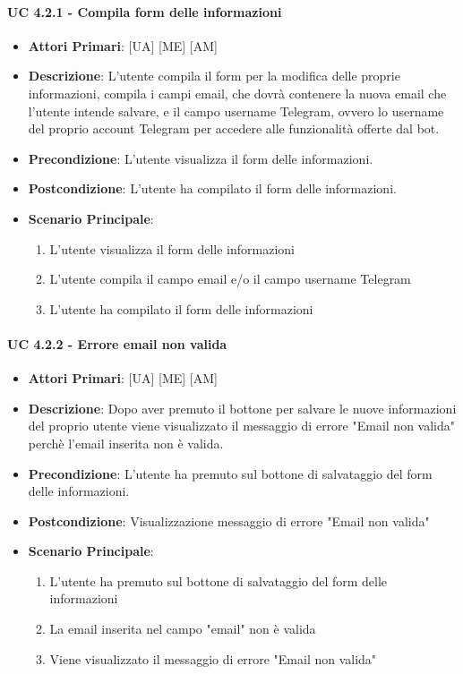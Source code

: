 			\paragraph{UC 4.2.1 - Compila form delle informazioni}
			\begin{itemize}
				\item \textbf{Attori Primari}: [UA] [ME] [AM]
				\item \textbf{Descrizione}: L'utente compila il form per la modifica delle proprie informazioni, compila i campi email, che dovrà contenere la nuova email che l'utente intende salvare, e il campo username Telegram, ovvero lo username del proprio account Telegram per accedere alle funzionalità offerte dal bot.
				\item \textbf{Precondizione}: L'utente visualizza il form delle informazioni.
				\item \textbf{Postcondizione}: L'utente ha compilato il form delle informazioni.
				\item \textbf{Scenario Principale}:
				\begin{enumerate}
					\item{L'utente visualizza il form delle informazioni}
					\item{L'utente compila il campo email e/o il campo username Telegram}
					\item{L'utente ha compilato il form delle informazioni}
				\end{enumerate}
			\end{itemize}

			\paragraph{UC 4.2.2 - Errore email non valida}
			\begin{itemize}
				\item \textbf{Attori Primari}: [UA] [ME] [AM]
				\item \textbf{Descrizione}: Dopo aver premuto il bottone per salvare le nuove informazioni del proprio utente viene visualizzato il messaggio di errore "Email non valida" perchè l'email inserita non è valida. 
				\item \textbf{Precondizione}: L'utente ha premuto sul bottone di salvataggio del form delle informazioni.
				\item \textbf{Postcondizione}: Visualizzazione messaggio di errore "Email non valida"
				\item \textbf{Scenario Principale}:
				\begin{enumerate}
					\item{L'utente ha premuto sul bottone di salvataggio del form delle informazioni}
					\item{La email inserita nel campo "email" non è valida}
					\item{Viene visualizzato il messaggio di errore "Email non valida"}
				\end{enumerate}	
			\end{itemize}

